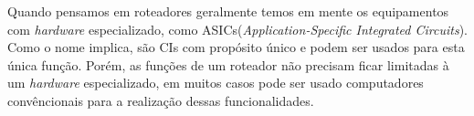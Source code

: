 
Quando pensamos em roteadores geralmente temos em mente os equipamentos com \textit{hardware} especializado, como ASICs(\textit{Application-Specific Integrated Circuits}). Como o nome implica, são CIs com propósito único e podem ser usados para esta única função. Porém, as funções de um roteador não precisam ficar limitadas à um \textit{hardware} especializado, em muitos casos pode ser usado computadores convêncionais para a realização dessas funcionalidades.
